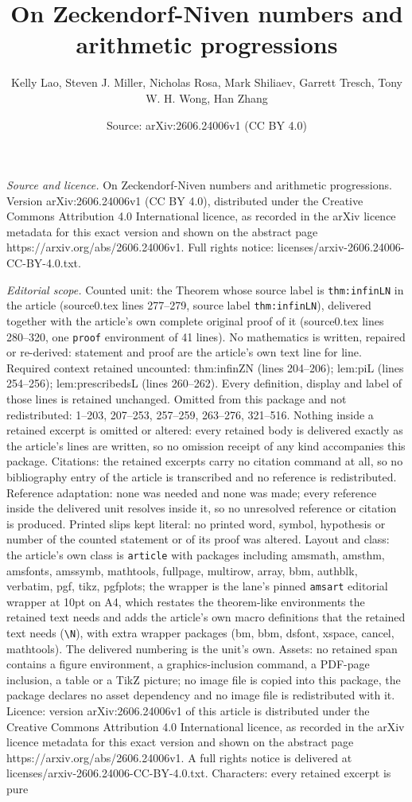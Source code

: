 \documentclass[10pt,a4paper]{amsart}
\title[On Zeckendorf-Niven numbers and arithmetic progressions]{On Zeckendorf-Niven numbers and arithmetic progressions}
\author{Kelly Lao, Steven J. Miller, Nicholas Rosa, Mark Shiliaev, Garrett Tresch, Tony W. H. Wong, Han Zhang}
\date{Source: arXiv:2606.24006v1 (CC BY 4.0)}
\begin{document}
\maketitle

\noindent\emph{Source and licence.} On Zeckendorf-Niven numbers and arithmetic progressions. Version arXiv:2606.24006v1 (CC BY 4.0), distributed under the Creative Commons Attribution 4.0 International licence, as recorded in the arXiv licence metadata for this exact version and shown on the abstract page https://arxiv.org/abs/2606.24006v1. Full rights notice: licenses/arxiv-2606.24006-CC-BY-4.0.txt.\par\smallskip

\noindent\textit{Editorial scope.} Counted unit: the Theorem whose source label is \texttt{thm:infinLN} in the article (source0.tex lines 277--279, source label \texttt{thm:infinLN}), delivered together with the article's own complete original proof of it (source0.tex lines 280--320, one \texttt{proof} environment of 41 lines). No mathematics is written, repaired or re-derived: statement and proof are the article's own text line for line. Required context retained uncounted: thm:infinZN (lines 204--206); lem:piL (lines 254--256); lem:prescribedsL (lines 260--262). Every definition, display and label of those lines is retained unchanged. Omitted from this package and not redistributed: 1--203, 207--253, 257--259, 263--276, 321--516. Nothing inside a retained excerpt is omitted or altered: every retained body is delivered exactly as the article's lines are written, so no omission receipt of any kind accompanies this package. Citations: the retained excerpts carry no citation command at all, so no bibliography entry of the article is transcribed and no reference is redistributed. Reference adaptation: none was needed and none was made; every reference inside the delivered unit resolves inside it, so no unresolved reference or citation is produced. Printed slips kept literal: no printed word, symbol, hypothesis or number of the counted statement or of its proof was altered. Layout and class: the article's own class is \texttt{article} with packages including amsmath, amsthm, amsfonts, amssymb, mathtools, fullpage, multirow, array, bbm, authblk, verbatim, pgf, tikz, pgfplots; the wrapper is the lane's pinned \texttt{amsart} editorial wrapper at 10pt on A4, which restates the theorem-like environments the retained text needs and adds the article's own macro definitions that the retained text needs (\texttt{\textbackslash N}), with extra wrapper packages (bm, bbm, dsfont, xspace, cancel, mathtools). The delivered numbering is the unit's own. Assets: no retained span contains a figure environment, a graphics-inclusion command, a PDF-page inclusion, a table or a TikZ picture; no image file is copied into this package, the package declares no asset dependency and no image file is redistributed with it. Licence: version arXiv:2606.24006v1 of this article is distributed under the Creative Commons Attribution 4.0 International licence, as recorded in the arXiv licence metadata for this exact version and shown on the abstract page https://arxiv.org/abs/2606.24006v1. A full rights notice is delivered at licenses/arxiv-2606.24006-CC-BY-4.0.txt. Characters: every retained excerpt is pure 
\end{document}
